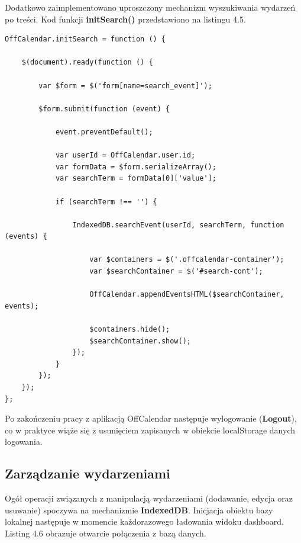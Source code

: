 Dodatkowo zaimplementowano uproszczony mechanizm wyszukiwania wydarzeń po treści. Kod funkcji \textbf{initSearch()} przedstawiono na listingu 4.5.

\begin{lstlisting}[style=js, caption=Wyszukiwanie wydarzeń w oparciu o treść., label=amb, captionpos=b]
OffCalendar.initSearch = function () {

    $(document).ready(function () {
    
        var $form = $('form[name=search_event]');

        $form.submit(function (event) {

            event.preventDefault();

            var userId = OffCalendar.user.id;
            var formData = $form.serializeArray();
            var searchTerm = formData[0]['value'];

            if (searchTerm !== '') {

                IndexedDB.searchEvent(userId, searchTerm, function (events) {

                    var $containers = $('.offcalendar-container');
                    var $searchContainer = $('#search-cont');

                    OffCalendar.appendEventsHTML($searchContainer, events);

                    $containers.hide();
                    $searchContainer.show();
                });
            }
        });
    });
};
\end{lstlisting}

Po zakończeniu pracy z aplikacją OffCalendar następuje wylogowanie (\textbf{Logout}), co w praktyce wiąże się z usunięciem zapisanych w obiekcie localStorage danych logowania.

\subsection{Zarządzanie wydarzeniami}
\label{sec:zarzWyd}

Ogół operacji związanych z manipulacją wydarzeniami (dodawanie, edycja oraz usuwanie) spoczywa na mechanizmie \textbf{IndexedDB}. Inicjacja obiektu bazy lokalnej następuje w momencie każdorazowego ładowania widoku dashboard. Listing 4.6 obrazuje otwarcie połączenia z bazą danych.


